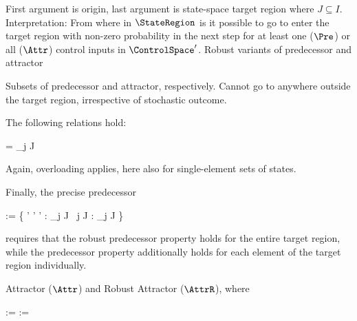     First argument is origin, last argument is state-space target region where $J \subseteq I$.
    Interpretation: From where in $\StateRegion$ is it possible to go to enter the target region with non-zero probability in the next step for at least one ($\Pre$) or all ($\Attr$) control inputs in $\ControlSpace'$.
    Robust variants of predecessor and attractor

    Subsets of predecessor and attractor, respectively.
    Cannot go to anywhere outside the target region, irrespective of stochastic outcome.

    The following relations hold:

    \startformula
        \startalign[n=2,align={right,left}]
            \NC {} =
            \NC \bigcup_{j \in J}  \EndComma
            \NR
            \NC {} \subseteq
            \NC {} \EndComma
            \NR
        \stopalign
    \stopformula

    Again, overloading applies, here also for single-element sets of states.

    Finally, the precise predecessor

    \startformula
        \startalign[n=2,align={right,left}]
            \NC {} := \Big\{ \VecState \in \StateSpace' \Bigmid \exists \VecControl' \in \ControlSpace' :
            \NC {} \subseteq \bigcup_{j \in J}  \;
            \NR
            \NC \empty
            \NC ~\forall j \in J :  \cap \bigcup_{j \in J}  \neq \emptyset \Big\}
            \NR
        \stopalign
    \stopformula

    requires that the robust predecessor property holds for the entire target region, while the predecessor property additionally holds for each element of the target region individually.

\stopsection


\startsubsection[title={Attractors}]

    Attractor ($\Attr$) and Robust Attractor ($\AttrR$), where

    \startformula
        \startalign[n=2,align={right,left}]
            \NC {} :=
            \NC {} \EndPeriod
            \NR
            \NC {} :=
            \NC {} \EndPeriod
            \NR
        \stopalign
    \stopformula

